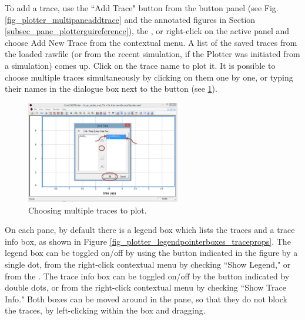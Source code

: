 To add a trace, use the ``Add Trace" button from the button panel (see Fig. \ref{fig_plotter_multipaneaddtrace} and the annotated figures in Section \ref{subsec_pane_plotterguireference}), the , or right-click on the active panel and choose \textsf{Add New Trace} from the contextual menu. A list of the saved traces from the loaded rawfile (or from the recent simulation, if the Plotter was initiated from a simulation) comes up.  Click on the trace name to plot it.  It is possible to choose multiple traces simultaneously by clicking on them one by one, or typing their names in the dialogue box next to the  button (see \ref{fig_plotter_multipletraceadd}). 


\begin{figure}
    \includegraphics[width=0.6\textwidth]{./figures/plotter_netlist_editor_figures/Plotter_AddingTraces_SinglePanel.png}
    \caption{{Choosing multiple traces to plot.}}
  \label{fig_plotter_multipletraceadd}
\end{figure}

 On each pane, by default there is a legend box which lists the traces and a trace info box, as shown in Figure \ref{fig_plotter_legendpointerboxes_traceprops}.  The legend box can be toggled on/off by using the button indicated in the figure by a single dot, from the right-click contextual menu by checking ``\textsf{Show Legend}," or from the . The trace info box can be toggled on/off by the button indicated by double dots, or from the right-click contextual menu by checking ``\textsf{Show Trace Info}." Both boxes can be moved around in the pane, so that they do not block the traces, by left-clicking within the box and dragging.

